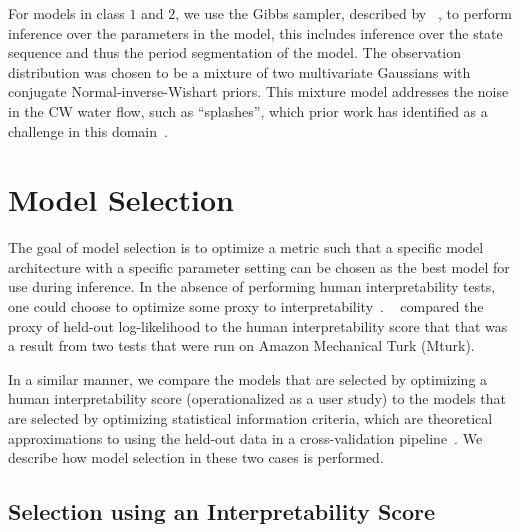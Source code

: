 \documentclass[letterpaper]{article} %
\newcommand{\citename}[1]{\citeauthor{#1}~\shortcite{#1}}
\newcommand{\kibitz}[2]{\ifnum\Comments=1{\textcolor{#1}{#2}}\fi}
\newcommand{\nh}[1]{\kibitz{blue}{[NH:#1]}}
\begin{document}
For models in class $1$ and $2$, we use the Gibbs sampler, described by \citename{fox2008hdp}, to perform inference over the parameters in the model, this includes inference over the state sequence and thus the period segmentation of the model. The observation distribution was chosen to be a mixture of two multivariate Gaussians with conjugate Normal-inverse-Wishart priors. This mixture model addresses the noise in the CW water flow, such as ``splashes'', which prior work has identified as a challenge in this domain~\cite{hoernle2018modeling}.

\section{Model Selection}
\label{sec:model_selection}
The goal of model selection is to optimize a metric such that a specific model architecture with a specific parameter setting can be chosen as the best model for use during inference. 
In the absence of performing human interpretability tests, one could choose to optimize some proxy to interpretability~\cite{doshi2017roadmap,lage2018human}. \citename{chang2009reading} compared the proxy of held-out log-likelihood to the human interpretability score that that was a result from two tests that were run on Amazon Mechanical Turk (Mturk).

In a similar manner, we compare the models that are selected by optimizing a human interpretability score  (operationalized as a user  study) to the models that are selected by optimizing statistical information criteria, which are theoretical approximations to using the held-out data in a cross-validation pipeline~\cite{gelman2013bayesian}. 
We describe how model selection in these two cases is performed. 

\subsection{Selection using an Interpretability Score}
\end{document}
